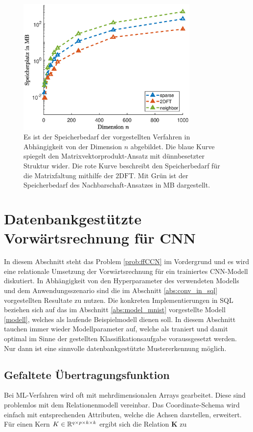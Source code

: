\begin{figure}[h]
    \includegraphics[width=0.8\textwidth]{pics/chapters/kap5/data_plot_vergleich_disk.eps}
    \centering
    \caption[Vergleich des zusätzlichen Speicherbedarfs]{Es ist der Speicherbedarf der vorgestellten Verfahren in Abhängigkeit von der Dimension $n$ abgebildet. Die blaue Kurve spiegelt den Matrixvektorprodukt-Ansatz mit dünnbesetzter Struktur wider. Die rote Kurve beschreibt den Speicherbedarf für die Matrixfaltung mithilfe der $\mathrm{2DFT}$. Mit Grün ist der Speicherbedarf des Nachbarschaft-Ansatzes in MB dargestellt.}
    \label{abb:vergleich_disk}
\end{figure}

\section{Datenbankgestützte Vorwärtsrechnung für CNN}
\label{abs_CNN_in_SQL}
In diesem Abschnitt steht das Problem \ref{prob:ffCCN} im Vordergrund und es wird eine relationale Umsetzung der Vorwärtsrechnung für ein trainiertes CNN-Modell diskutiert. In Abhängigkeit von den Hyperparameter des verwendeten Modells und dem Anwendungsszenario sind die im Abschnitt \ref{abs:conv_in_sql} vorgestellten Resultate zu nutzen.    
Die konkreten Implementierungen in SQL beziehen sich auf das im Abschnitt \ref{abs:model_mnist} vorgestellte Modell \ref{modell}, welches als laufende Beispielmodell dienen soll. In diesem Abschnitt tauchen immer wieder Modellparameter auf, welche als traniert und damit optimal im Sinne der gestellten Klassifikationsaufgabe voraussgesetzt werden. Nur dann ist eine sinnvolle datenbankgestützte Mustererkennung möglich.  

\subsection*{Gefaltete Übertragungsfunktion}
Bei ML-Verfahren wird oft mit mehrdimensionalen Arrays gearbeitet. Diese sind problemlos mit dem Relationenmodell vereinbar. Das Coordinate-Schema wird einfach mit entsprechenden Attributen, welche die Achsen darstellen, erweitert. Für einen Kern $K \in \mathbb{R}^{q \times p \times k \times k}$ ergibt sich die Relation \textbf{K} zu

